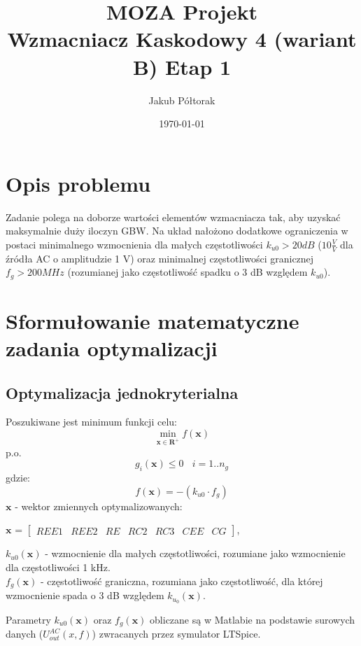 \documentclass{article}
\title{\huge  \Huge \textbf{MOZA Projekt} \\ \textbf{Wzmacniacz Kaskodowy 4 (wariant B)}}
\date{\today}
\author{ \LARGE Jakub Półtorak}
\begin{document}
\maketitle
{}
\newpage
{}
\tableofcontents

\pagebreak

\begin{center}
	\title{ \huge \textbf{Etap 1}}
\end{center}


\section*{Opis problemu}
Zadanie polega na doborze wartości elementów wzmacniacza tak, aby uzyskać maksymalnie duży iloczyn
GBW. Na układ nałożono dodatkowe ograniczenia w postaci minimalnego wzmocnienia dla małych częstotliwości $k_{u0} > 20 dB$ ($10 \frac{V}{V}$ dla źródła AC o amplitudzie 1 V) oraz minimalnej częstotliwości
granicznej $f_g > 200 MHz$ (rozumianej jako częstotliwość spadku o 3 dB względem $k_{u0}$).
\section{Sformułowanie matematyczne zadania optymalizacji}

\subsection{Optymalizacja jednokryterialna}
Poszukiwane jest minimum funkcji celu:
\[ \min\limits_{\textbf{x}\in \mathbf{R}^+  } f(\textbf{x}) \]
p.o.
\[ g_{i}(\textbf{x}) \leq 0 \ \ \ \  i=1..n_g\]
gdzie:
\[ f(\textbf{x}) = -(k_{u0}\cdot f_g)\]
\(\textbf{x}\) - wektor zmiennych optymalizowanych: \\
\begin{center}
	$\textbf{x}$ =
	$\begin{bmatrix}
			REE1 & REE2 & RE & RC2 & RC3 & CEE & CG
		\end{bmatrix}$,
\end{center}
\(k_{u0}(\textbf{x})\) - wzmocnienie dla małych częstotliwości, rozumiane jako wzmocnienie dla częstotliwości 1 kHz.\\
\(f_{g}(\textbf{x})\) - częstotliwość graniczna, rozumiana jako częstotliwość, dla której wzmocnienie
spada o 3 dB względem $k_{u_{0}}(\textbf{x}) $.

Parametry $k_{u0}(\textbf{x})$ oraz $f_g(\textbf{x})$ obliczane są w Matlabie na podstawie surowych danych ($U^{AC}_{out}(x,f)$) zwracanych
przez symulator LTSpice.
\end{document}
